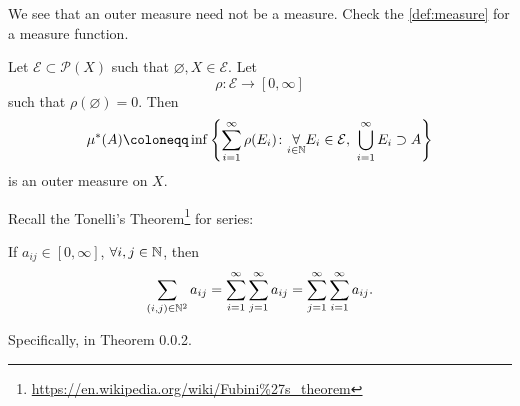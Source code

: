 \begin{remark}
	We see that an outer measure need not be a measure. Check the \autoref{def:measure} for a measure function.
\end{remark}

\begin{proposition}\label{prop:outer-measure}
	Let \(\mathcal{E} \subset \mathcal{P} (X)\) such that \(\varnothing, X \in  \mathcal{E} \). Let
	\[
		\rho\colon \mathcal{E} \to [0, \infty ]
	\]
	such that \(\rho(\varnothing ) = 0\). Then
	\[
		\mu^{*} (A) \coloneqq \inf\left\{\sum\limits_{i=1}^{\infty} \rho(E_{i})\colon \underset{i\in \mathbb{\MakeUppercase{N}} }{\forall}E_{i}\in \mathcal{E},\ \bigcup\limits_{i=1}^{\infty} E_{i}\supset A\right\}
	\]
	is an outer measure on \(X\).
\end{proposition}

\begin{note}\label{thm:Tonelli-theorem-for-series}
	Recall the Tonelli's Theorem\footnote{\url{https://en.wikipedia.org/wiki/Fubini\%27s_theorem}} for series:
	\par If \(a_{ij}\in [0, \infty ]\), \(\forall i, j\in \mathbb{\MakeUppercase{N}} \), then
	\[
		\sum\limits_{(i, j)\in\mathbb{\MakeUppercase{N}} ^2}a_{ij} = \sum\limits_{i=1}^{\infty} \sum\limits_{j=1}^{\infty} a_{ij} = \sum\limits_{j=1}^{\infty} \sum\limits_{i=1}^{\infty} a_{ij}.
	\]

	Specifically, in \cite{tao2013introduction} Theorem 0.0.2.
\end{note}
